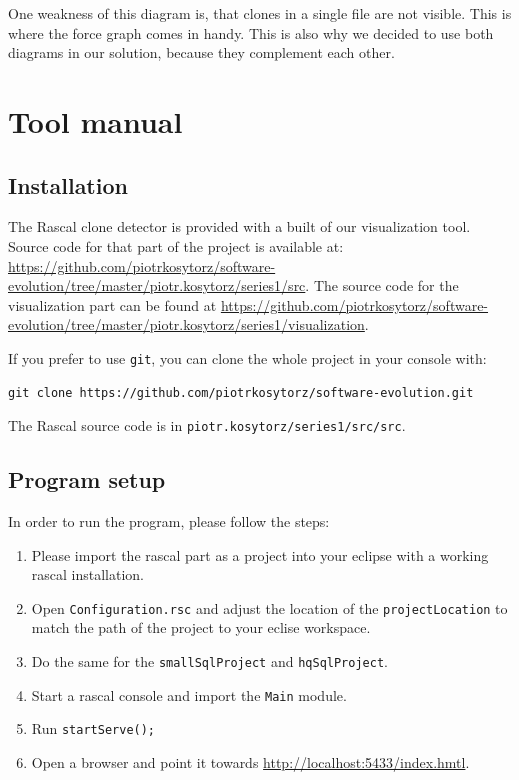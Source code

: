 \documentclass{uva-inf-article}
\begin{document}
One weakness of this diagram is, that clones in a single file are not visible. This is where the force graph comes in handy. This is also why we decided to use both diagrams in our solution, because they complement each other.

\section{Tool manual}

\subsection{Installation}

The Rascal clone detector is provided with a built of our visualization tool. Source code for that part of the project is available at: \url{https://github.com/piotrkosytorz/software-evolution/tree/master/piotr.kosytorz/series1/src}. The source code for the visualization part can be found at \url{https://github.com/piotrkosytorz/software-evolution/tree/master/piotr.kosytorz/series1/visualization}.

If you prefer to use \texttt{git}, you can clone the whole project in your console with:

\begin{verbatim}
git clone https://github.com/piotrkosytorz/software-evolution.git
\end{verbatim}

The Rascal source code is in \texttt{piotr.kosytorz/series1/src/src}.

\subsection{Program setup}

In order to run the program, please follow the steps:

\begin{enumerate}
\item Please import the rascal part as a project into your eclipse with a working rascal installation.
\item
  Open \texttt{Configuration.rsc} and adjust the location of the \texttt{projectLocation} to match the path of the project to your eclise workspace.
\item Do the same for the \texttt{smallSqlProject} and \texttt{hqSqlProject}.
\item Start a rascal console and import the \texttt{Main} module.
\item Run \texttt{startServe();}
\item Open a browser and point it towards \url{http://localhost:5433/index.hmtl}.
\end{enumerate}
\end{document}
